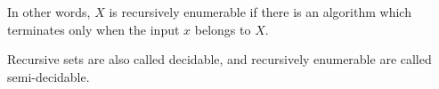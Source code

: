 

\setcounter{section}{3}
\setcounter{subsection}{4}
\setcounter{dfn}{27}

In other words, $X$ is recursively enumerable if there is an algorithm which terminates only when the input $x$ belongs to $X$.

Recursive sets are also called decidable, and recursively enumerable are called semi-decidable.


